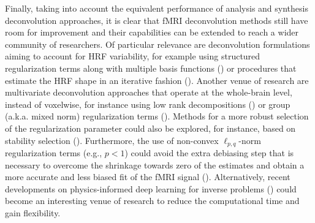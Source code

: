 Finally, taking into account the equivalent performance of analysis and synthesis deconvolution approaches, it is clear that fMRI deconvolution methods still have room for improvement and their capabilities can be extended to reach a wider community of researchers. Of particular relevance are deconvolution formulations aiming to account for HRF variability, for example using structured regularization terms along with multiple basis functions (\citealt{Gaudes2012Structuredsparsedeconvolution}) or procedures that estimate the HRF shape in an iterative fashion (\citealt{Farouj2019BoldSignalDeconvolution,cherkaoui:hal-03005584}). Another venue of research are multivariate deconvolution approaches that operate at the whole-brain level, instead of voxelwise, for instance using low rank decompositions (\citealt{cherkaoui:hal-03005584, Urunuela_2021}) or group (a.k.a. mixed norm) regularization terms (\citealt{urunuela-tremino_2019}). Methods for a more robust selection of the regularization parameter could also be explored, for instance, based on stability selection (\citealt{Meinshausen2010Stabilityselection,Urunuela2020StabilityBasedSparse}). Furthermore, the use of non-convex \(\ell_{p,q}\)-norm regularization terms (e.g., \(p < 1\)) could avoid the extra debiasing step that is necessary to overcome the shrinkage towards zero of the estimates and obtain a more accurate and less biased fit of the fMRI signal  (\citealt{Gaudes2013Paradigmfreemapping,CaballeroGaudes2019deconvolutionalgorithmmulti}). Alternatively, recent developments on physics-informed deep learning for inverse problems (\citealt{Akcakaya2021,Monga2021,Ongie2020}) could become an interesting venue of research to reduce the computational time and gain flexibility.